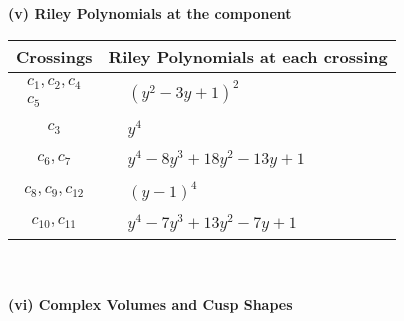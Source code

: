 \documentclass[1p]{elsarticle_modified}
\theoremstyle{definition}
\begin{document}
\newpage\renewcommand{\arraystretch}{1}
\flushleft \textbf{(v) Riley Polynomials at the component}\newline \\
\begin{tabular}{m{50pt}|m{274pt}}
Crossings & \hspace{64pt}Riley Polynomials at each crossing \\
\hline $$\begin{aligned}c_{1},c_{2},c_{4}\\c_{5}\end{aligned}$$&$\begin{aligned}
&(y^2-3 y+1)^2
\end{aligned}$\\
\hline $$\begin{aligned}c_{3}\end{aligned}$$&$\begin{aligned}
&y^4
\end{aligned}$\\
\hline $$\begin{aligned}c_{6},c_{7}\end{aligned}$$&$\begin{aligned}
&y^4-8 y^3+18 y^2-13 y+1
\end{aligned}$\\
\hline $$\begin{aligned}c_{8},c_{9},c_{12}\end{aligned}$$&$\begin{aligned}
&(y-1)^4
\end{aligned}$\\
\hline $$\begin{aligned}c_{10},c_{11}\end{aligned}$$&$\begin{aligned}
&y^4-7 y^3+13 y^2-7 y+1
\end{aligned}$\\
\hline
\end{tabular}\\~\\
\newpage\flushleft \textbf{(vi) Complex Volumes and Cusp Shapes}
\end{document}
